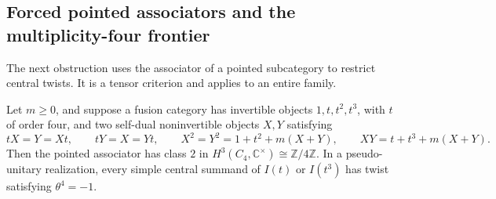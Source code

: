 \subsection{Forced pointed associators and the multiplicity-four frontier}
\label{sec:c4-forced-associator}

The next obstruction uses the associator of a pointed subcategory to restrict
central twists. It is a tensor criterion and applies to an entire family.

\begin{proposition}\label{prop:c4-forced-associator}
Let $m\geq0$, and suppose a fusion category has invertible objects
$1,t,t^2,t^3$, with $t$ of order four, and two self-dual noninvertible
objects $X,Y$ satisfying
\[
 tX=Y=Xt,\qquad tY=X=Yt,\qquad
 X^2=Y^2=1+t^2+m(X+Y),\qquad XY=t+t^3+m(X+Y).
\]
Then the pointed associator has class $2$ in
$H^3(C_4,\mathbb C^\times)\cong\mathbb Z/4\mathbb Z$.
In a pseudo-unitary realization, every simple central summand of
$I(t)$ or $I(t^3)$ has twist satisfying $\theta^4=-1$.
\end{proposition}
